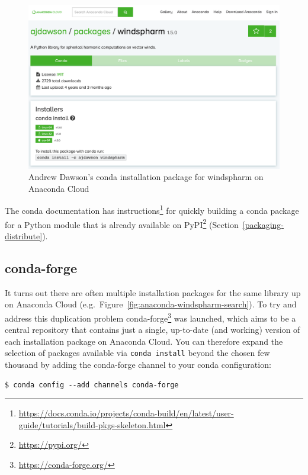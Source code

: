 \documentclass[
]{krantz}
\renewcommand{\href}[2]{#2\footnote{\url{#1}}}
\begin{document}
\begin{figure}

{\centering \includegraphics[width=1\linewidth]{figures/anaconda/cloud-windspharm-ajdawson} 

}

\caption{Andrew Dawson's conda installation package for windspharm on Anaconda Cloud}\label{fig:anaconda-windspharm-ajdawson}
\end{figure}

The conda documentation has \href{https://docs.conda.io/projects/conda-build/en/latest/user-guide/tutorials/build-pkgs-skeleton.html}{instructions} for quickly building
a conda package for a Python module that is already available on \href{https://pypi.org/}{PyPI}
(Section~\ref{packaging-distribute}).

\hypertarget{conda-forge}{%
\subsection{conda-forge}\label{conda-forge}}

It turns out there are often multiple installation packages for the same library
up on Anaconda Cloud (e.g.~Figure~\ref{fig:anaconda-windspharm-search}).
To try and address this duplication problem \href{https://conda-forge.org/}{conda-forge} was launched,
which aims to be a central repository that contains just a single, up-to-date (and working)
version of each installation package on Anaconda Cloud.
You can therefore expand the selection of packages available via \texttt{conda\ install}
beyond the chosen few thousand by adding the conda-forge channel to your conda configuration:

\begin{verbatim}
$ conda config --add channels conda-forge
\end{verbatim}
\end{document}
